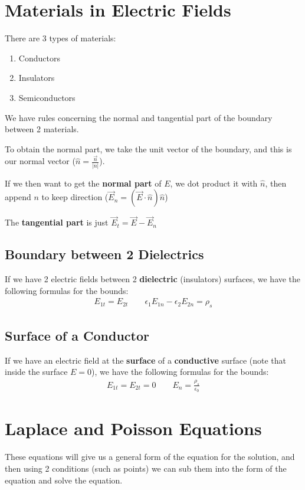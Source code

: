 \documentclass[12pt,letterpaper]{article} \usepackage{amsmath} \usepackage{graphicx} \usepackage[margin=1in]{geometry} \usepackage{longtable}  \usepackage{amssymb}
\begin{document}
	\section{Materials in Electric Fields}
	There are 3 types of materials:
	\begin{enumerate}[]
		\item Conductors
		\item Insulators
		\item Semiconductors
	\end{enumerate}

	We have rules concerning the normal and tangential part of the boundary between 2 materials. 
	
	To obtain the normal part, we take the unit vector of the boundary, and this is our normal vector ($\hat n = \frac{\vec n}{|n|}$).
	
	If we then want to get the \textbf{normal part} of $E$, we dot product it with $\hat n$, then append $n$ to keep direction ($\vec E_n = (\vec E\cdot \hat n)\hat n$)
	
	The \textbf{tangential part }is just $\vec E_t = \vec E - \vec E_n$

	\subsection{Boundary between 2 Dielectrics}
	If we have 2 electric fields between 2 \textbf{dielectric} (insulators) surfaces, we have the following formulas for the bounds:
	\begin{align*}
		E_{1t} = E_{2t} \qquad \epsilon_1E_{1n}-\epsilon_2 E_{2n} = \rho_s
	\end{align*}

	\subsection{Surface of a Conductor}
	If we have an electric field at the \textbf{surface }of a \textbf{conductive} surface (note that inside the surface $E=0$), we have the following formulas for the bounds:
	\begin{align*}
		E_{1t} = E_{2t} = 0 \qquad E_{n} = \frac{\rho_s}{\epsilon_0}
	\end{align*}

	\section{Laplace and Poisson Equations}
	These equations will give us a general form of the equation for the solution, and then using 2 conditions (such as points) we can sub them into the form of the equation and solve the equation. 
	
\end{document}
